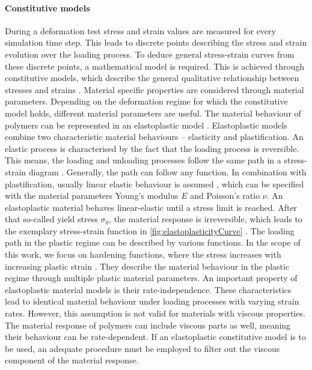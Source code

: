 \paragraph{Constitutive models}
During a deformation test stress and strain values are measured for every simulation time step. This leads to discrete points describing the stress and strain evolution over the loading process. To deduce general stress-strain curves from these discrete points, a mathematical model is required. This is achieved through constitutive models, which describe the general qualitative relationship between stresses and strains \cite{mergheim_lecture_nodate}. Material specific properties are considered through material parameters.
Depending on the deformation regime for which the constitutive model holds, different material parameters are useful. The material behaviour of polymers can be represented in an elastoplastic model \cite{ward_mechanical_2013}. Elastoplastic models combine two characteristic material behaviours – elasticity and plastification. An elastic process is characterised by the fact that the loading process is reversible. This means, the loading and unloading processes follow the same path in a stress-strain diagram \cite{mergheim_lecture_nodate}. Generally, the path can follow any function. In combination with plastification, usually linear elastic behaviour is assumed \cite{saabye_ottosen_mechanics_2005}, which can be specified with the material parameters Young's modulus $E$ and Poisson's ratio $\nu$. An elastoplastic material behaves linear-elastic until a stress limit is reached. After that so-called yield stress $\sigma_0$, the material response is irreversible, which leads to the exemplary stress-strain function in \autoref{fig:elastoplasticityCurve} \cite{mergheim_lecture_nodate}. The loading path in the plastic regime can be described by various functions. In the scope of this work, we focus on hardening functions, where the stress increases with increasing plastic strain \cite{saabye_ottosen_mechanics_2005}. They describe the material behaviour in the plastic regime through multiple plastic material parameters. An important property of elastoplastic material models is their rate-independence. These characteristics lead to identical material behaviour under loading processes with varying strain rates. However, this assumption is not valid for materials with viscous properties. The material response of polymers can include viscous parts as well, meaning their behaviour can be rate-dependent. If an elastoplastic constitutive model is to be used, an adequate procedure must be employed to filter out the viscous component of the material response. 


